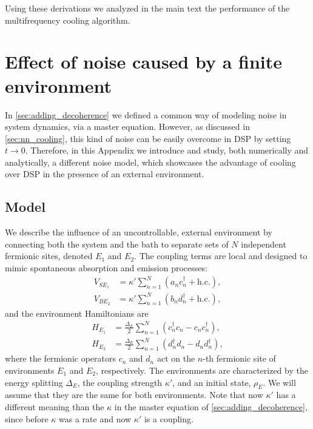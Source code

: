 Using these derivations we analyzed in the main text the performance of the multifrequency cooling algorithm.

\section{Effect of noise caused by a finite environment}
\label{app:finite_noise}

In \cref{sec:adding_decoherence} we defined a common way of modeling noise in system dynamics, via a master equation. However, as discussed in \cref{sec:nn_cooling}, this kind of noise can be easily overcome in DSP by setting $t\rightarrow 0$. Therefore, in this Appendix we introduce and study, both numerically and analytically, a different noise model, which showcases the advantage of cooling over DSP in the presence of an external environment.
\subsection{Model}
\label{subapp:finite_noise_model}

We describe the influence of an uncontrollable, external environment by connecting both the system and the bath to separate sets of $N$ independent fermionic sites, denoted $E_1$ and $E_2$. The coupling terms are local and designed to mimic spontaneous absorption and emission processes:
\begin{align}
    V_{SE_1} &= \kappa'\sum_{n=1}^N \left(a_n {c}_n^\dag + \text{h.c.}\right), \label{eq:V_SE}\\
    V_{BE_2} &= \kappa'\sum_{n=1}^N \left({b}_n {d}_n^\dag + \text{h.c.}\right), \label{eq:V_BE}
\end{align}
and the environment Hamiltonians are
\begin{align}
    H_{E_1} &= \frac{\Delta_E}{2} \sum_{n=1}^N \left({c}_n^\dag {c}_n - c_n {c}_n^\dag\right), \label{eq:H_E1}\\
    H_{E_2} &= \frac{\Delta_E}{2}\sum_{n=1}^N \left({d}_n^\dag {d}_n - d_n {d}_n^\dag \right), \label{eq:H_E2}
\end{align}
where the fermionic operators $c_n$ and $d_n$ act on the $n$-th fermionic site of environments $E_1$ and $E_2$, respectively. The environments are characterized by the energy splitting $\Delta_E$, the coupling strength $\kappa'$, and an initial state, $\rho_E$. We will assume that they are the same for both environments. Note that now $\kappa'$ has a different meaning than the $\kappa$ in the master equation of \cref{sec:adding_decoherence}, since before $\kappa$ was a rate and now $\kappa'$ is a coupling.

